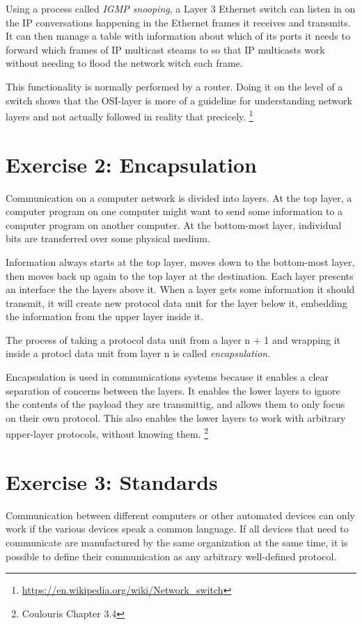 \documentclass[a4paper]{article}
\begin{document}
Using a process called \textit{IGMP snooping}, a Layer 3 Ethernet switch can listen in on the IP conversations happening in the Ethernet frames it receives and transmits. It can then manage a table with information about which of its ports it needs to forward which frames of IP multicast steams to so that IP multicasts work without needing to flood the network witch each frame.

This functionality is normally performed by a router. Doing it on the level of a switch shows that the OSI-layer is more of a guideline for understanding network layers and not actually followed in reality that precicely.  
\footnote{\url{https://en.wikipedia.org/wiki/Network_switch}}

\section{Exercise 2: Encapsulation}

Communication on a computer network is divided into layers. At the top layer, a computer program on one computer might want to send some information to a computer program on another computer. At the bottom-most layer, individual bits are transferred over some physical medium. 

Information always starts at the top layer, moves down to the bottom-most layer, then moves back up again to the top layer at the destination. Each layer presents an interface the the layers above it. When a layer gets some information it should transmit, it will create new protocol data unit for the layer below it, embedding the information from the upper layer inside it.

The process of taking a protocol data unit from a layer n + 1 and wrapping it inside a protocl data unit from layer n is called \textit{encapsulation}.

Encapsulation is used in communications systems because it enables a clear separation of concerns between the layers. It enables the lower layers to ignore the contents of the payload they are transmittig, and allows them to only focus on their own protocol. This also enables the lower layers to work with arbitrary upper-layer protocols, without knowing them. \footnote{Coulouris Chapter 3.4}

\section{Exercise 3: Standards}

Communication between different computers or other automated devices can only work if the various devices speak a common language. If all devices that need to communicate are manufactured by the same organization at the same time, it is possible to define their communication as any arbitrary well-defined protocol.
\end{document}
